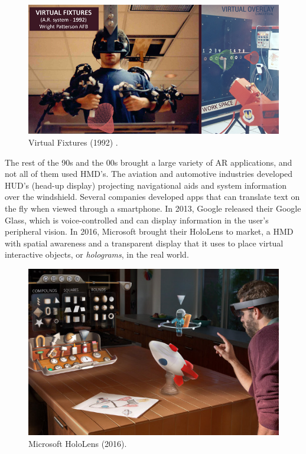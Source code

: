 \begin{figure}
    \centering
    \includegraphics[width=0.8\linewidth]{resources/introduction/virtual_fixtures.jpg}
    \caption{Virtual Fixtures (1992) \cite{sutherland1968head}.}
    \label{fig:virtual_fixtures}
\end{figure}

The rest of the 90s and the 00s brought a large variety of AR applications, and not all of them used HMD's. The aviation and automotive industries developed HUD's (head-up display) projecting navigational aids and system information over the windshield. Several companies developed apps that can translate text on the fly when viewed through a smartphone. In 2013, Google released their Google Glass, which is voice-controlled and can display information in the user's peripheral vision. In 2016, Microsoft brought their HoloLens to market, a HMD with spatial awareness and a transparent display that it uses to place virtual interactive objects, or \textit{holograms}, in the real world.

\begin{figure}
    \centering
    \includegraphics[width=0.8\linewidth]{resources/introduction/hololens.jpg}
    \caption{Microsoft HoloLens (2016).}
    \label{fig:hololens}
\end{figure}


